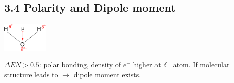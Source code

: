 \subsection{3.4 Polarity and Dipole moment} 
\begin{minipage}{25mm}
    \includegraphics[width=2.2cm]{src/3_Chemical_bondings/images/dipole_moment.png}
\end{minipage}
\begin{minipage}{42mm}
    $\Delta EN>0.5$: polar bonding, density of $e^-$ higher at $\delta^-$ atom.
        If molecular structure leads to  $\rightarrow$ dipole moment exists.
\end{minipage}    

